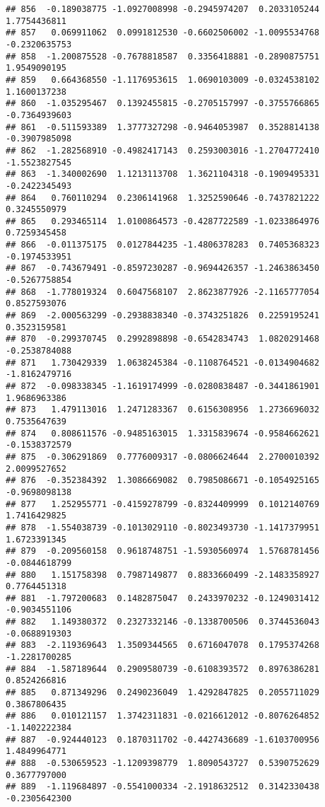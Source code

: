 \documentclass[
]{article}
\begin{document}
\begin{verbatim}
## 856  -0.189038775 -1.0927008998 -0.2945974207  0.2033105244  1.7754436811
## 857   0.069911062  0.0991812530 -0.6602506002 -1.0095534768 -0.2320635753
## 858  -1.200875528 -0.7678818587  0.3356418881 -0.2890875751  1.9549090195
## 859   0.664368550 -1.1176953615  1.0690103009 -0.0324538102  1.1600137238
## 860  -1.035295467  0.1392455815 -0.2705157997 -0.3755766865 -0.7364939603
## 861  -0.511593389  1.3777327298 -0.9464053987  0.3528814138 -0.3907985098
## 862  -1.282568910 -0.4982417143  0.2593003016 -1.2704772410 -1.5523827545
## 863  -1.340002690  1.1213113708  1.3621104318 -0.1909495331 -0.2422345493
## 864   0.760110294  0.2306141968  1.3252590646 -0.7437821222  0.3245550979
## 865   0.293465114  1.0100864573 -0.4287722589 -1.0233864976  0.7259345458
## 866  -0.011375175  0.0127844235 -1.4806378283  0.7405368323 -0.1974533951
## 867  -0.743679491 -0.8597230287 -0.9694426357 -1.2463863450 -0.5267758854
## 868  -1.778019324  0.6047568107  2.8623877926 -2.1165777054  0.8527593076
## 869  -2.000563299 -0.2938838340 -0.3743251826  0.2259195241  0.3523159581
## 870  -0.299370745  0.2992898898 -0.6542834743  1.0820291468 -0.2538784088
## 871   1.730429339  1.0638245384 -0.1108764521 -0.0134904682 -1.8162479716
## 872  -0.098338345 -1.1619174999 -0.0280838487 -0.3441861901  1.9686963386
## 873   1.479113016  1.2471283367  0.6156308956  1.2736696032  0.7535647639
## 874   0.808611576 -0.9485163015  1.3315839674 -0.9584662621 -0.1538372579
## 875  -0.306291869  0.7776009317 -0.0806624644  2.2700010392  2.0099527652
## 876  -0.352384392  1.3086669082  0.7985086671 -0.1054925165 -0.9698098138
## 877   1.252955771 -0.4159278799 -0.8324409999  0.1012140769  1.7416429825
## 878  -1.554038739 -0.1013029110 -0.8023493730 -1.1417379951  1.6723391345
## 879  -0.209560158  0.9618748751 -1.5930560974  1.5768781456 -0.0844618799
## 880   1.151758398  0.7987149877  0.8833660499 -2.1483358927  0.7764451318
## 881  -1.797200683  0.1482875047  0.2433970232 -0.1249031412 -0.9034551106
## 882   1.149380372  0.2327332146 -0.1338700506  0.3744536043 -0.0688919303
## 883  -2.119369643  1.3509344565  0.6716047078  0.1795374268 -1.2281700285
## 884  -1.587189644  0.2909580739 -0.6108393572  0.8976386281  0.8524266816
## 885   0.871349296  0.2490236049  1.4292847825  0.2055711029  0.3867806435
## 886   0.010121157  1.3742311831 -0.0216612012 -0.8076264852 -1.1402222384
## 887  -0.924440123  0.1870311702 -0.4427436689 -1.6103700956  1.4849964771
## 888  -0.530659523 -1.1209398779  1.8090543727  0.5390752629  0.3677797000
## 889  -1.119684897 -0.5541000334 -2.1918632512  0.3142330438 -0.2305642300

\end{verbatim}
\end{document}
